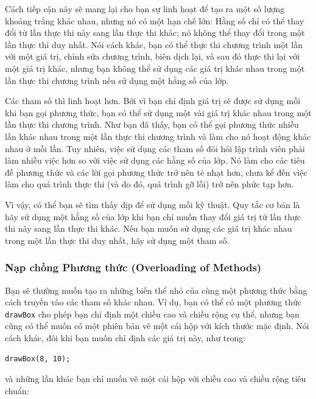 Cách tiếp cận này sẽ mang lại cho bạn sự linh hoạt để tạo ra một số
lượng khoảng trắng khác nhau, nhưng nó có một hạn chế lớn: Hằng số chỉ
có thể thay đổi từ lần thực thi này sang lần thực thi khác; nó không thể
thay đổi trong một lần thực thi duy nhất. Nói cách khác, bạn có thể thực
thi chương trình một lần với một giá trị, chỉnh sửa chương trình, biên
dịch lại, và sau đó thực thi lại với một giá trị khác, nhưng bạn không
thể sử dụng các giá trị khác nhau trong một lần thực thi chương trình
nếu sử dụng một hằng số của lớp.

Các tham số thì linh hoạt hơn. Bởi vì bạn chỉ định giá trị sẽ được sử
dụng mỗi khi bạn gọi phương thức, bạn có thể sử dụng một vài giá trị
khác nhau trong một lần thực thi chương trình. Như bạn đã thấy, bạn có
thể gọi phương thức nhiều lần khác nhau trong một lần thực thi chương
trình và làm cho nó hoạt động khác nhau ở mỗi lần. Tuy nhiên, việc sử
dụng các tham số đòi hỏi lập trình viên phải làm nhiều việc hơn so với
việc sử dụng các hằng số của lớp. Nó làm cho các tiêu đề phương thức và
các lời gọi phương thức trở nên tẻ nhạt hơn, chưa kể đến việc làm cho
quá trình thực thi (và do đó, quá trình gỡ lỗi) trở nên phức tạp hơn.

Vì vậy, có thể bạn sẽ tìm thấy dịp để sử dụng mỗi kỹ thuật. Quy tắc cơ
bản là hãy sử dụng một hằng số của lớp khi bạn chỉ muốn thay đổi giá trị
từ lần thực thi này sang lần thực thi khác. Nếu bạn muốn sử dụng các giá
trị khác nhau trong một lần thực thi duy nhất, hãy sử dụng một tham số.

\subsubsection{Nạp chồng Phương thức (Overloading of
Methods)}\label{nux1ea1p-chux1ed3ng-phux1b0ux1a1ng-thux1ee9c-overloading-of-methods}

Bạn sẽ thường muốn tạo ra những biến thể nhỏ của cùng một phương thức
bằng cách truyền vào các tham số khác nhau. Ví dụ, bạn có thể có một
phương thức \texttt{drawBox} cho phép bạn chỉ định một chiều cao và
chiều rộng cụ thể, nhưng bạn cũng có thể muốn có một phiên bản vẽ một
cái hộp với kích thước mặc định. Nói cách khác, đôi khi bạn muốn chỉ
định các giá trị này, như trong:

\begin{verbatim}
drawBox(8, 10);
\end{verbatim}

và những lần khác bạn chỉ muốn vẽ một cái hộp với chiều cao và chiều
rộng tiêu chuẩn:

